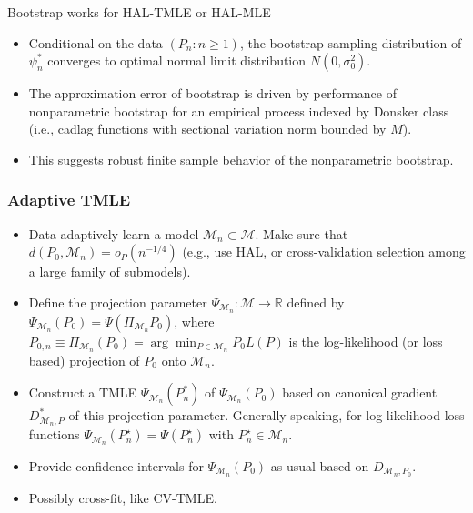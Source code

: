 \documentclass[t]{beamer}
\begin{document}
 \begin{frame}{Bootstrap works for HAL-TMLE or HAL-MLE}
 \begin{itemize}
 \item Conditional on the data $(P_n:n\geq 1)$, the bootstrap sampling distribution of  $\psi_n^*$ converges to optimal normal limit distribution $N(0,\sigma^2_0)$.
 \item The approximation error of bootstrap is driven by performance of nonparametric bootstrap for an empirical process indexed by Donsker class (i.e., cadlag functions with sectional variation norm bounded by $M$).
 \item This suggests  robust finite sample behavior of the nonparametric bootstrap.
 \end{itemize}
\end{frame}

\begin{frame}
\frametitle{Adaptive TMLE}
\begin{itemize}
\item Data adaptively learn a model $\mathcal{M}_n \subset \mathcal{M}$. Make
sure that $d(P_0, \mathcal{M}_n)=o_P(n^{-1/4})$ (e.g., use HAL, or
cross-validation selection among a large family of submodels).
\item Define the projection parameter
$\Psi_{\mathcal{M}_n}:\mathcal{M} \rightarrow \mathbb{R}$ defined by
$\Psi_{\mathcal{M}_n}(P_0)=\Psi(\Pi_{\mathcal{M}_n}P_0)$, where $P_{0,n}\equiv
\Pi_{\mathcal{M}_n}(P_0)=\arg\min_{P \in \mathcal{M}_n} P_0L(P)$ is the log-likelihood (or loss
based) projection of $P_0$ onto $\mathcal{M}_n$.
\item Construct a TMLE $\Psi_{\mathcal{M}_n}(P_n^*)$ of
$\Psi_{\mathcal{M}_n}(P_0)$ based on canonical gradient $D^*_{\mathcal{M}_n,P}$
of this projection parameter.
Generally speaking, for log-likelihood loss functions
$\Psi_{\mathcal{M}_n}(P_n^{\star})=\Psi(P_n^{\star})$ with $P_n^{\star} \in
\mathcal{M}_n$.
\item Provide confidence intervals for $\Psi_{\mathcal{M}_n}(P_0)$ as usual
based on $D_{\mathcal{M}_n,P_0}$.
\item Possibly cross-fit, like CV-TMLE.
\end{itemize}
\end{frame}
\end{document}

